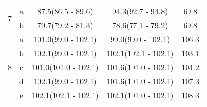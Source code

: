 \begin{table}[H]
\begin{tabular}{c|c|c|c|c}
\multirow{2}{*}{7} & a & 87.5(86.5 - 89.6) & 94.3(92.7 - 94.8) & 69.8\\ 
 & b & 79.7(79.2 - 81.3) & 78.6(77.1 - 79.2) & 69.8\\ 
\hline

\multirow{5}{*}{8} & a & 101.0(99.0 - 102.1) & 99.0(99.0 - 102.1) & 106.3\\ 
 & b & 102.1(99.0 - 102.1) & 102.1(102.1 - 102.1) & 103.1\\ 
 & c & 101.0(101.0 - 102.1) & 101.6(101.0 - 102.1) & 104.2\\ 
 & d & 102.1(99.0 - 102.1) & 101.6(101.0 - 102.1) & 107.3\\ 
 & e & 102.1(102.1 - 102.1) & 102.1(101.0 - 102.1) & 108.3\\ 
\hline\hline
	\end{tabular}
	\label{tab:resultsComplex}
\end{table}

